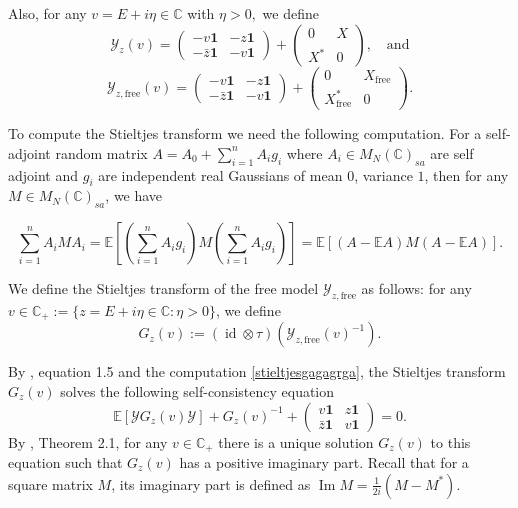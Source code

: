 \documentclass[11pt,reqno]{amsart}
\theoremstyle{plain}
\theoremstyle{remark}
\numberwithin{equation}{section}
\begin{document}
Also, for any $v=E+i\eta\in\mathbb{C}$ with $\eta>0,$ we define
$$
\mathcal{Y}_{z}(v)=\begin{pmatrix}
    -v \mathbf{1}& -z\mathbf{1}\\-\bar{z}\mathbf{1}&-v \mathbf{1}\end{pmatrix}+\begin{pmatrix}
    0& X_{}\\X^*&0\end{pmatrix},\quad\text{and}$$
$$
\mathcal{Y}_{z,\text{free}}(v)=\begin{pmatrix}
    -v \mathbf{1}& -z\mathbf{1}\\-\bar{z}\mathbf{1}&-v \mathbf{1}\end{pmatrix}+\begin{pmatrix}
    0& X_{\text{free}}\\X^*_{\text{free}}&0\end{pmatrix}.
$$


To compute the Stieltjes transform we need the following computation. For a self-adjoint random matrix $A=A_0+\sum_{i=1}^nA_ig_i$ where $A_i\in M_N(\mathbb{C})_{sa}$ are self adjoint and $g_i$ are independent real Gaussians of mean $0$, variance $1$, then for any $M\in M_N(\mathbb{C})_{sa}$, we have

\begin{equation}\label{stieltjesgagagrga}
\sum_{i=1}^n A_iMA_i=\mathbb{E}\left[(\sum_{i=1}^n A_ig_i)M(\sum_{i=1}^n A_ig_i)\right]=\mathbb{E}\left[(A-\mathbb{E}A)M(A-\mathbb{E}A)\right].
\end{equation}


We define the Stieltjes transform of the free model $\mathcal{Y}_{z,\text{free}}$ as follows: for any $v\in\mathbb{C}_+:=\{z=E+i\eta\in\mathbb{C}:\eta>0\}$, we define
$$
G_z(v):=(\operatorname{id}\otimes\tau)(\mathcal{Y}_{z,\text{free}}(v)^{-1}).
$$


By \cite{haagerup2005new}, equation 1.5 and the computation \eqref{stieltjesgagagrga}, the Stieltjes transform $G_z(v)$ solves the following self-consistency equation
\begin{equation}\label{matrixdysomequationsfag}
\mathbb{E}[\mathcal{Y}G_z(v)\mathcal{Y}]+G_z(v)^{-1}+\begin{pmatrix} v \mathbf{1}& z \mathbf{1}\\\bar{z}\mathbf{1}& v \mathbf{1}
\end{pmatrix}=0.\end{equation} By \cite{helton2007operator}, Theorem 2.1, for any $v\in\mathbb{C}_+$ there is a unique solution $G_z(v)$ to this equation such that $G_z(v)$ has a positive imaginary part. Recall that for a square matrix $M$, its imaginary part is defined as $\operatorname{Im}M=\frac{1}{2i}(M-M^*)$.
\end{document}
